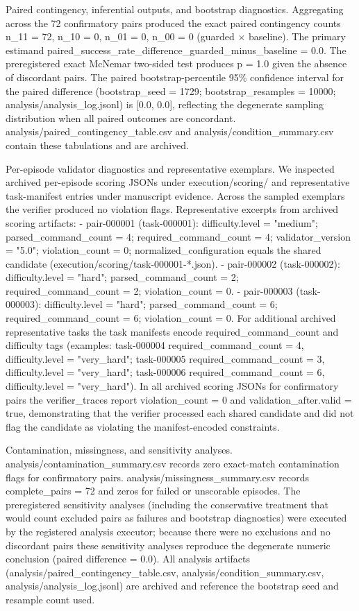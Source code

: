 \documentclass[conference]{IEEEtran}
\begin{document}
Paired contingency, inferential outputs, and bootstrap diagnostics. Aggregating across the 72 confirmatory pairs produced the exact paired contingency counts n\_11 = 72, n\_10 = 0, n\_01 = 0, n\_00 = 0 (guarded \ensuremath{\times} baseline). The primary estimand paired\_success\_rate\_difference\_guarded\_minus\_baseline = 0.0. The preregistered exact McNemar two-sided test produces p = 1.0 given the absence of discordant pairs. The paired bootstrap-percentile 95\% confidence interval for the paired difference (bootstrap\_seed = 1729; bootstrap\_resamples = 10000; analysis/analysis\_log.jsonl) is [0.0, 0.0], reflecting the degenerate sampling distribution when all paired outcomes are concordant. analysis/paired\_contingency\_table.csv and analysis/condition\_summary.csv contain these tabulations and are archived.

Per-episode validator diagnostics and representative exemplars. We inspected archived per-episode scoring JSONs under execution/scoring/ and representative task-manifest entries under manuscript evidence. Across the sampled exemplars the verifier produced no violation flags. Representative excerpts from archived scoring artifacts:
- pair-000001 (task-000001): difficulty.level = "medium"; parsed\_command\_count = 4; required\_command\_count = 4; validator\_version = "5.0"; violation\_count = 0; normalized\_configuration equals the shared candidate (execution/scoring/task-000001-*.json).
- pair-000002 (task-000002): difficulty.level = "hard"; parsed\_command\_count = 2; required\_command\_count = 2; violation\_count = 0.
- pair-000003 (task-000003): difficulty.level = "hard"; parsed\_command\_count = 6; required\_command\_count = 6; violation\_count = 0.
For additional archived representative tasks the task manifests encode required\_command\_count and difficulty tags (examples: task-000004 required\_command\_count = 4, difficulty.level = "very\_hard"; task-000005 required\_command\_count = 3, difficulty.level = "very\_hard"; task-000006 required\_command\_count = 6, difficulty.level = "very\_hard"). In all archived scoring JSONs for confirmatory pairs the verifier\_traces report violation\_count = 0 and validation\_after.valid = true, demonstrating that the verifier processed each shared candidate and did not flag the candidate as violating the manifest-encoded constraints.

Contamination, missingness, and sensitivity analyses. analysis/contamination\_summary.csv records zero exact-match contamination flags for confirmatory pairs. analysis/missingness\_summary.csv records complete\_pairs = 72 and zeros for failed or unscorable episodes. The preregistered sensitivity analyses (including the conservative treatment that would count excluded pairs as failures and bootstrap diagnostics) were executed by the registered analysis executor; because there were no exclusions and no discordant pairs these sensitivity analyses reproduce the degenerate numeric conclusion (paired difference = 0.0). All analysis artifacts (analysis/paired\_contingency\_table.csv, analysis/condition\_summary.csv, analysis/analysis\_log.jsonl) are archived and reference the bootstrap seed and resample count used.
\end{document}
